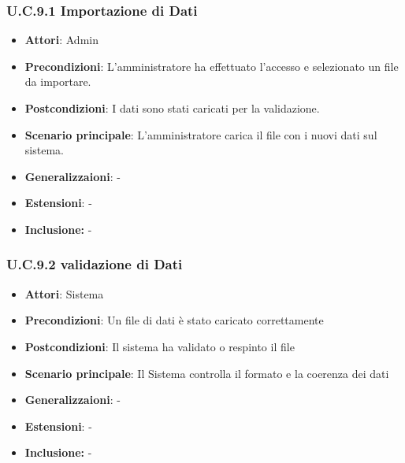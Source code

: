 \subsubsection{U.C.9.1 Importazione di Dati}
\begin{itemize}
    \item \textbf{Attori}: Admin
    \item \textbf{Precondizioni}: L’amministratore ha effettuato l’accesso e selezionato un file da importare.
    \item \textbf{Postcondizioni}: I dati sono stati caricati per la validazione.
    \item \textbf{Scenario principale}: L’amministratore carica il file con i nuovi dati sul sistema.
    \item \textbf{Generalizzaioni}: -
    \item \textbf{Estensioni}: -
    \item \textbf{Inclusione:} -
\end{itemize}
\subsubsection{U.C.9.2 validazione di Dati}
\begin{itemize}
    \item \textbf{Attori}: Sistema
    \item \textbf{Precondizioni}: Un file di dati è stato caricato correttamente
    \item \textbf{Postcondizioni}: Il sistema ha validato o respinto il file
    \item \textbf{Scenario principale}: Il Sistema controlla il formato e la coerenza dei dati
    \item \textbf{Generalizzaioni}: -
    \item \textbf{Estensioni}: -
    \item \textbf{Inclusione:} -
\end{itemize}

